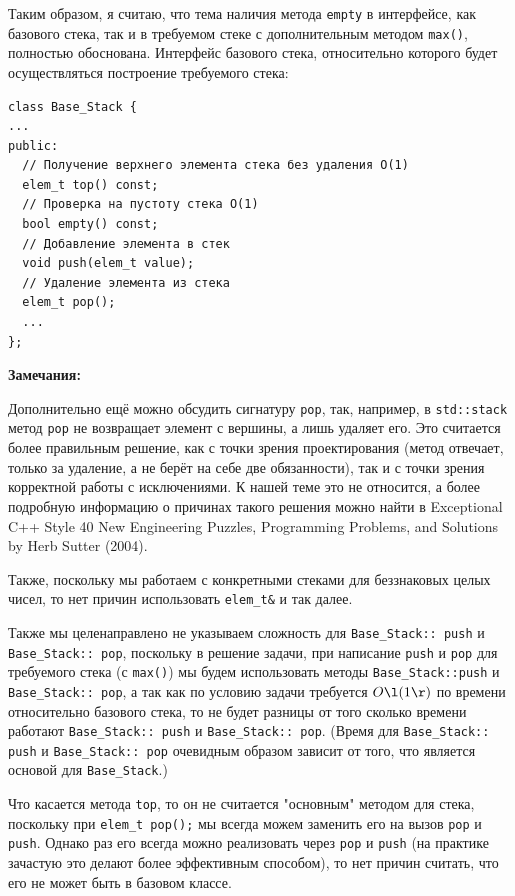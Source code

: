 Таким образом, я считаю, что тема наличия метода \texttt{empty} в интерфейсе, как базового стека, так и в требуемом стеке с дополнительным методом \texttt{max()}, полностью обоснована.
Интерфейс базового стека, относительно которого будет осуществляться построение требуемого стека: 
\begin{verbatim}
class Base_Stack {
...
public:
  // Получение верхнего элемента стека без удаления O(1)
  elem_t top() const; 
  // Проверка на пустоту стека O(1)
  bool empty() const; 
  // Добавление элемента в стек
  void push(elem_t value);
  // Удаление элемента из стека
  elem_t pop();
  ...
};
\end{verbatim}

\textbf{Замечания:}

  Дополнительно ещё можно обсудить сигнатуру \texttt{pop}, так, например, в \texttt{std::stack} метод \texttt{pop} не возвращает элемент с вершины, а лишь удаляет его. Это считается более правильным решение, как с точки зрения проектирования (метод отвечает, только за удаление, а не берёт на себе две обязанности), так и с точки зрения корректной работы с исключениями. К нашей теме это не относится, а более подробную информацию о причинах такого решения можно найти в Exceptional C++ Style 40 New Engineering Puzzles, Programming Problems, and Solutions by Herb Sutter (2004).

  Также, поскольку мы работаем с конкретными стеками для беззнаковых целых чисел, то нет причин использовать \texttt{elem_t\&} и так далее.

  Также мы целенаправлено не указываем сложность для \texttt{Base_Stack:: push} и \texttt{Base_Stack:: pop}, поскольку в решение задачи, при написание \texttt{push} и \texttt{pop} для требуемого стека (с \texttt{max()}) мы будем использовать методы \texttt{Base_Stack::push} и \texttt{Base_Stack:: pop}, а так как по условию задачи требуется \(O\l(1\r)\) по времени относительно базового стека, то не будет разницы от того сколько времени работают \texttt{Base_Stack:: push} и \texttt{Base_Stack:: pop}. (Время для \texttt{Base_Stack:: push} и \texttt{Base_Stack:: pop} очевидным образом зависит от того, что является основой для \texttt{Base_Stack}.)

  Что касается метода \texttt{top}, то он не считается "основным" методом для стека, поскольку при \texttt{elem_t pop();} мы всегда можем заменить его на вызов \texttt{pop} и \texttt{push}. Однако раз его всегда можно реализовать через \texttt{pop} и \texttt{push} (на практике зачастую это делают более эффективным способом), то нет причин считать, что его не может быть в базовом классе.

